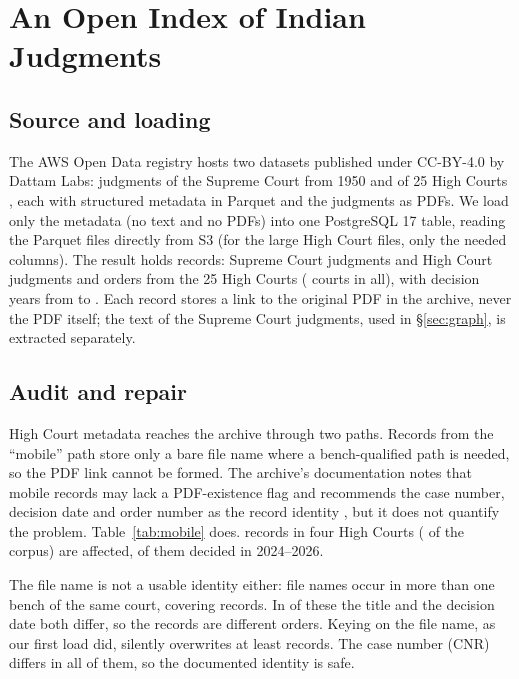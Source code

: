 \documentclass[conference]{IEEEtran}
\begin{document}
\section{An Open Index of Indian Judgments}
\label{sec:corpus}
\subsection{Source and loading}
The AWS Open Data registry hosts two datasets published under CC-BY-4.0 by Dattam Labs: judgments of the Supreme Court from 1950 \cite{awssc} and of 25 High Courts \cite{awshc}, each with structured metadata in Parquet and the judgments as PDFs. We load only the metadata (no text and no PDFs) into one PostgreSQL 17 table, reading the Parquet files directly from S3 (for the large High Court files, only the needed columns). The result holds \CorpusTotal{} records: \CorpusSC{} Supreme Court judgments and \CorpusHC{} High Court judgments and orders from the 25 High Courts (\CorpusCourts{} courts in all), with decision years from \CorpusYearMin{} to \CorpusYearMax. Each record stores a link to the original PDF in the archive, never the PDF itself; the text of the Supreme Court judgments, used in \S\ref{sec:graph}, is extracted separately.

\subsection{Audit and repair}
High Court metadata reaches the archive through two paths. Records from the ``mobile'' path store only a bare file name where a bench-qualified path is needed, so the PDF link cannot be formed. The archive's documentation notes that mobile records may lack a PDF-existence flag and recommends the case number, decision date and order number as the record identity \cite{hcdatasetdoc}, but it does not quantify the problem. Table~\ref{tab:mobile} does. \MobileTotal{} records in four High Courts (\MobilePct{} of the corpus) are affected, \MobileRecentPct{} of them decided in 2024--2026.

The file name is not a usable identity either: \CollideStems{} file names occur in more than one bench of the same court, covering \CollideRows{} records. In \CollideDiffBothPct{} of these the title and the decision date both differ, so the records are different orders. Keying on the file name, as our first load did, silently overwrites at least \CollideLost{} records. The case number (CNR) differs in all of them, so the documented identity is safe.
\end{document}
